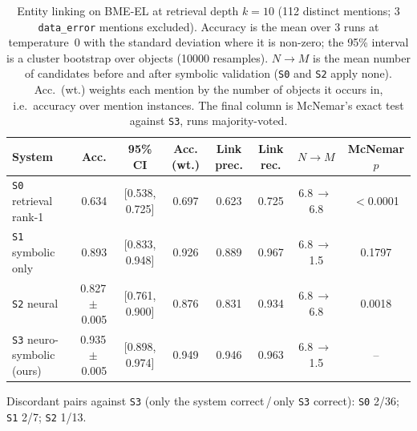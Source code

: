 \begin{table}[t]
\centering
\small
\caption{Entity linking on BME-EL at retrieval depth $k=10$ (112 distinct mentions; 3 \texttt{data\_error} mentions excluded). Accuracy is the mean over 3 runs at temperature~0 with the standard deviation where it is non-zero; the 95\% interval is a cluster bootstrap over objects (10000 resamples). $N\to M$ is the mean number of candidates before and after symbolic validation (\texttt{S0} and \texttt{S2} apply none). Acc.\ (wt.) weights each mention by the number of objects it occurs in, i.e.\ accuracy over mention instances. The final column is McNemar's exact test against \texttt{S3}, runs majority-voted.}
\label{tab:el-main}
\begin{tabular}{lccccccc}
\toprule
System & Acc. & 95\% CI & Acc. (wt.) & Link prec. & Link rec. & $N\to M$ & McNemar $p$ \\
\midrule
\texttt{S0} retrieval rank-1 & 0.634 & [0.538, 0.725] & 0.697 & 0.623 & 0.725 & 6.8\,$\to$\,6.8 & $<$0.0001 \\
\texttt{S1} symbolic only & 0.893 & [0.833, 0.948] & 0.926 & 0.889 & 0.967 & 6.8\,$\to$\,1.5 & 0.1797 \\
\texttt{S2} neural & 0.827\,$\pm$\,0.005 & [0.761, 0.900] & 0.876 & 0.831 & 0.934 & 6.8\,$\to$\,6.8 & 0.0018 \\
\texttt{S3} neuro-symbolic (ours) & 0.935\,$\pm$\,0.005 & [0.898, 0.974] & 0.949 & 0.946 & 0.963 & 6.8\,$\to$\,1.5 & -- \\
\bottomrule
\end{tabular}
\vspace{2pt}
\par\footnotesize Discordant pairs against \texttt{S3} (only the system correct\,/\,only \texttt{S3} correct): \texttt{S0} 2/36; \texttt{S1} 2/7; \texttt{S2} 1/13.
\end{table}
